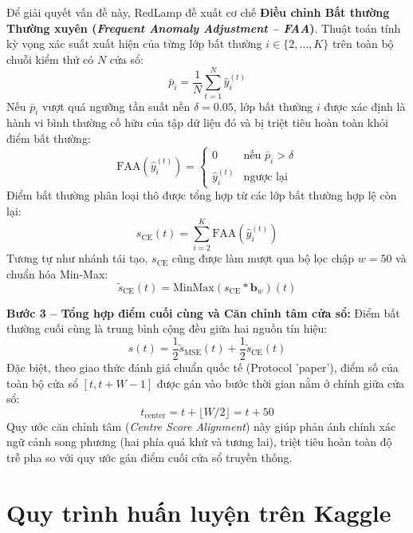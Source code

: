 \documentclass[sigconf,nonacm]{acmart}
\begin{document}
Để giải quyết vấn đề này, RedLamp đề xuất cơ chế \textbf{Điều chỉnh Bất thường Thường xuyên (\textit{Frequent Anomaly Adjustment -- FAA})}. Thuật toán tính kỳ vọng xác suất xuất hiện của từng lớp bất thường $i \in \{2, \dots, K\}$ trên toàn bộ chuỗi kiểm thử có $N$ cửa sổ:
\begin{equation}
    \bar{p}_i = \frac{1}{N} \sum_{t=1}^N \hat{y}_i^{(t)}
\end{equation}
Nếu $\bar{p}_i$ vượt quá ngưỡng tần suất nền $\delta = 0.05$, lớp bất thường $i$ được xác định là hành vi bình thường cố hữu của tập dữ liệu đó và bị triệt tiêu hoàn toàn khỏi điểm bất thường:
\begin{equation}
    \text{FAA}\left(\hat{y}_i^{(t)}\right) = \begin{cases}
    0 & \text{nếu } \bar{p}_i > \delta \\
    \hat{y}_i^{(t)} & \text{ngược lại}
    \end{cases}
\end{equation}
Điểm bất thường phân loại thô được tổng hợp từ các lớp bất thường hợp lệ còn lại:
\begin{equation}
    s_{\text{CE}}(t) = \sum_{i=2}^K \text{FAA}\left(\hat{y}_i^{(t)}\right)
\end{equation}
Tương tự như nhánh tái tạo, $s_{\text{CE}}$ cũng được làm mượt qua bộ lọc chập $w=50$ và chuẩn hóa Min-Max:
\begin{equation}
    \tilde{s}_{\text{CE}}(t) = \text{MinMax}\left(s_{\text{CE}} * \mathbf{b}_w\right)(t)
\end{equation}

\textbf{Bước 3 -- Tổng hợp điểm cuối cùng và Căn chỉnh tâm cửa sổ:}
Điểm bất thường cuối cùng là trung bình cộng đều giữa hai nguồn tín hiệu:
\begin{equation}
    s(t) = \frac{1}{2} \tilde{s}_{\text{MSE}}(t) + \frac{1}{2} \tilde{s}_{\text{CE}}(t)
\end{equation}
Đặc biệt, theo giao thức đánh giá chuẩn quốc tế (Protocol 'paper'), điểm số của toàn bộ cửa sổ $[t, t+W-1]$ được gán vào bước thời gian nằm ở chính giữa cửa sổ:
\begin{equation}
    t_{\text{center}} = t + \lfloor W / 2 \rfloor = t + 50
\end{equation}
Quy ước căn chỉnh tâm (\textit{Centre Score Alignment}) này giúp phản ánh chính xác ngữ cảnh song phương (hai phía quá khứ và tương lai), triệt tiêu hoàn toàn độ trễ pha so với quy ước gán điểm cuối cửa sổ truyền thống.

\section{Quy trình huấn luyện trên Kaggle}
\end{document}
